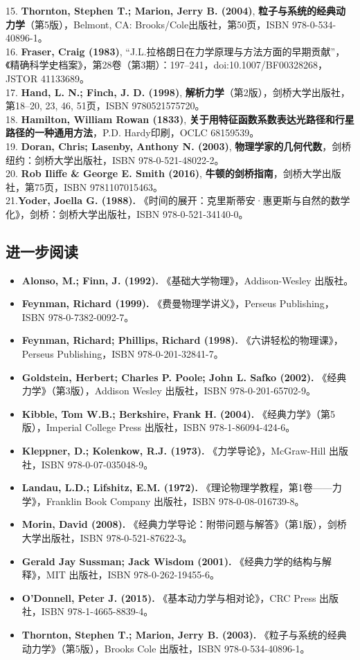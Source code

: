 15. \textbf{Thornton, Stephen T.; Marion, Jerry B. (2004)}, \textbf{粒子与系统的经典动力学}（第5版），Belmont, CA: Brooks/Cole出版社，第50页，ISBN 978-0-534-40896-1。\\
16. \textbf{Fraser, Craig (1983)}, “J.L.拉格朗日在力学原理与方法方面的早期贡献”，《精确科学史档案》，第28卷（第3期）：197–241，doi:10.1007/BF00328268，JSTOR 41133689。\\
17. \textbf{Hand, L. N.; Finch, J. D. (1998)}, \textbf{解析力学}（第2版），剑桥大学出版社，第18–20, 23, 46, 51页，ISBN 9780521575720。\\
18. \textbf{Hamilton, William Rowan (1833)}, \textbf{关于用特征函数系数表达光路径和行星路径的一种通用方法}，P.D. Hardy印刷，OCLC 68159539。\\
19. \textbf{Doran, Chris; Lasenby, Anthony N. (2003)}, \textbf{物理学家的几何代数}，剑桥纽约：剑桥大学出版社，ISBN 978-0-521-48022-2。\\
20. \textbf{Rob Iliffe & George E. Smith (2016)}, \textbf{牛顿的剑桥指南}，剑桥大学出版社，第75页，ISBN 9781107015463。\\
21.\textbf{Yoder, Joella G. (1988). }《时间的展开：克里斯蒂安·惠更斯与自然的数学化》，剑桥：剑桥大学出版社，ISBN 978-0-521-34140-0。
\subsection{进一步阅读}
\begin{itemize}
\item \textbf{Alonso, M.; Finn, J. (1992).} 《基础大学物理》，Addison-Wesley 出版社。
\item \textbf{Feynman, Richard (1999).} 《费曼物理学讲义》，Perseus Publishing，ISBN 978-0-7382-0092-7。
\item \textbf{Feynman, Richard; Phillips, Richard (1998).} 《六讲轻松的物理课》，Perseus Publishing，ISBN 978-0-201-32841-7。
\item \textbf{Goldstein, Herbert; Charles P. Poole; John L. Safko (2002).} 《经典力学》（第3版），Addison Wesley 出版社，ISBN 978-0-201-65702-9。
\item \textbf{Kibble, Tom W.B.; Berkshire, Frank H. (2004).} 《经典力学》（第5版），Imperial College Press 出版社，ISBN 978-1-86094-424-6。
\item \textbf{Kleppner, D.; Kolenkow, R.J. (1973).} 《力学导论》，McGraw-Hill 出版社，ISBN 978-0-07-035048-9。
\item \textbf{Landau, L.D.; Lifshitz, E.M. (1972).} 《理论物理学教程，第1卷——力学》，Franklin Book Company 出版社，ISBN 978-0-08-016739-8。
\item \textbf{Morin, David (2008).} 《经典力学导论：附带问题与解答》（第1版），剑桥大学出版社，ISBN 978-0-521-87622-3。
\item \textbf{Gerald Jay Sussman; Jack Wisdom (2001).} 《经典力学的结构与解释》，MIT 出版社，ISBN 978-0-262-19455-6。
\item \textbf{O'Donnell, Peter J. (2015).} 《基本动力学与相对论》，CRC Press 出版社，ISBN 978-1-4665-8839-4。
\item \textbf{Thornton, Stephen T.; Marion, Jerry B. (2003).} 《粒子与系统的经典动力学》（第5版），Brooks Cole 出版社，ISBN 978-0-534-40896-1。
\end{itemize}
